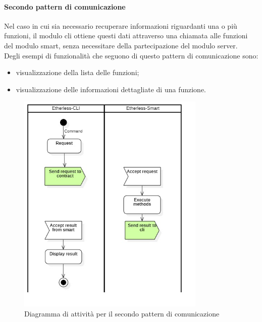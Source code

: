 	\paragraph{Secondo pattern di comunicazione}
		Nel caso in cui sia necessario recuperare informazioni riguardanti una o più funzioni, il modulo cli ottiene questi dati attraverso una chiamata alle funzioni del modulo smart, senza necessitare della partecipazione del modulo server.\\  Degli esempi di funzionalità che seguono di questo pattern di comunicazione sono:
		\begin{itemize}
			\item visualizzazione della lista delle funzioni;
			\item visualizzazione delle informazioni dettagliate di una funzione.
		\end{itemize}
	\begin{figure}[H]
		\centering
		\includegraphics[width=0.8\textwidth]{././diagrammi/generali/activity_diag_pattern1.jpg}
		\caption{Diagramma di attività per il secondo pattern di comunicazione}
	\end{figure}
